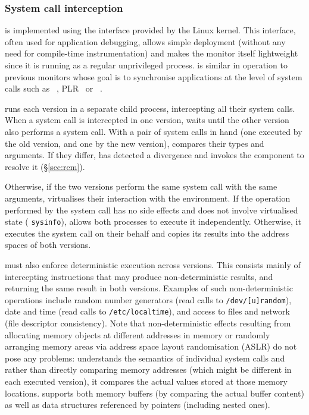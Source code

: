 \subsubsection{System call interception}

\mxm is implemented using the  \ptrace interface provided by the Linux
kernel.  This interface, often used for application debugging, allows
simple deployment (without any need for compile-time instrumentation)
and makes the monitor itself lightweight since it is running as a
regular unprivileged process.  \mxm is similar in operation to previous
monitors whose goal is to synchronise applications at the level of system
calls such as \orchestra~\cite{orchestra09}, PLR~\cite{shye2009} or
\tachyon~\cite{tachyon12}.

\mxm runs each version in a separate child process, intercepting all
their system calls.  When a system call is intercepted in one version,
\mxm waits until the other version also performs a system call.  With
a pair of system calls in hand (one executed by the old version, and
one by the new version), \mxm compares their types and arguments.  If
they differ, \mxm has detected a divergence and invokes the \rem
component to resolve it (\S\ref{sec:rem}).

Otherwise, if the two versions perform the same system call with the
same arguments, \mxm virtualises their interaction with the
environment.  If the operation performed by the system call has no
side effects and does not involve virtualised state (\eg
\lstinline`sysinfo`), \mxm allows both processes to execute it
independently.  Otherwise, it executes the system call on their
behalf and copies its results into the address spaces of both
versions.

\mxm must also enforce deterministic execution across versions. This
consists mainly of intercepting instructions that may produce
non-deterministic results, and returning the same result in both
versions.  Examples of such non-deterministic operations include
random number generators (\eg read calls to \lstinline`/dev/[u]random`),
date and time (\eg read calls to \lstinline`/etc/localtime`), and access
to files and network (\eg file descriptor consistency).  Note that
non-deterministic effects resulting from allocating memory objects at
different addresses in memory or randomly arranging memory areas via
address space layout randomisation (ASLR) do not pose any
problems: \mxm understands the semantics of individual system calls and
rather than directly comparing memory addresses (which might be
different in each executed version), it compares the actual values
stored at those memory locations. \mxm supports both memory buffers (by
comparing the actual buffer content) as well as data structures
referenced by pointers (including nested ones).
 
